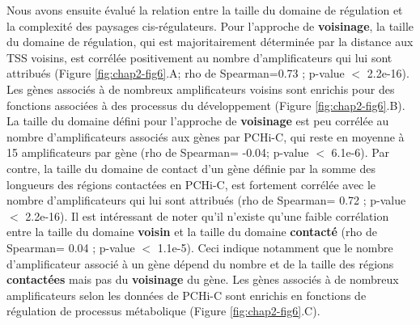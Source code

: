 Nous avons ensuite évalué la relation entre la taille du domaine de régulation et la complexité des paysages \gls{cis}-régulateurs. Pour l’approche de \textbf{voisinage}, la taille du domaine de régulation, qui est majoritairement déterminée par la distance aux \acrshort{TSS} voisins, est corrélée positivement au nombre d’amplificateurs qui lui sont attribués (Figure \ref{fig:chap2-fig6}.A; rho de Spearman=0.73 ; p-value $<$ 2.2e-16). Les gènes associés à de nombreux amplificateurs voisins sont enrichis pour des fonctions associées à des processus du développement (Figure \ref{fig:chap2-fig6}.B). La taille du domaine défini pour l'approche de \textbf{voisinage} est peu corrélée au nombre d’amplificateurs associés aux gènes par \gls{PCHi-C}, qui reste en moyenne à 15 amplificateurs par gène (rho de Spearman= -0.04; p-value $<$ 6.1e-6). Par contre, la taille du domaine de contact d’un gène définie par la somme des longueurs des régions contactées en \gls{PCHi-C}, est fortement corrélée avec le nombre d’amplificateurs qui lui sont attribués (rho de Spearman= 0.72 ; p-value $<$ 2.2e-16). Il est intéressant de noter qu’il n'existe qu’une faible corrélation entre la taille du domaine \textbf{voisin} et la taille du domaine \textbf{contacté} (rho de Spearman= 0.04 ; p-value $<$ 1.1e-5). Ceci indique notamment que le nombre d’amplificateur associé à un gène dépend du nombre et de la taille des régions \textbf{contactées} mais pas du \textbf{voisinage} du gène. Les gènes associés à de nombreux amplificateurs selon les données de PCHi-C sont enrichis en fonctions de régulation de processus métabolique (Figure \ref{fig:chap2-fig6}.C).

